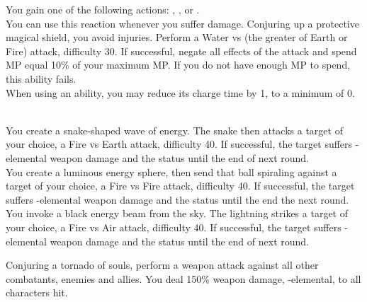 \begin{tabjob}
         You gain one of the following actions: , , or . \\

         You can use this reaction whenever you suffer damage. Conjuring up a protective magical shield, you avoid injuries. Perform a Water vs (the greater of Earth or Fire) attack, difficulty 30. If successful, negate all effects of the attack and spend MP equal 10\% of your maximum MP\@. If you do not have enough MP to spend, this ability fails. \\

         When using an ability, you may reduce its charge time by 1, to a minimum of 0. \\

    \tabjobsep%

    \\

         You create a snake-shaped wave of energy. The snake then attacks a target of your choice, a Fire vs Earth attack, difficulty 40. If successful, the target suffers -elemental weapon damage and the  status until the end of next round. \\
      
         You create a luminous energy sphere, then send that ball spiraling against a target of your choice, a Fire vs Fire attack, difficulty 40. If successful, the target suffers -elemental weapon damage and the  status until the end the next round. \\

         You invoke a black energy beam from the sky. The lightning strikes a target of your choice, a Fire vs Air attack, difficulty 40. If successful, the target suffers -elemental weapon damage and the  status until the end of next round. \\

    \tabjobspec{}%

         Conjuring a tornado of souls, perform a weapon attack against all other combatants, enemies and allies. You deal 150\% weapon damage, -elemental, to all characters hit. \\
       

\end{tabjob}
